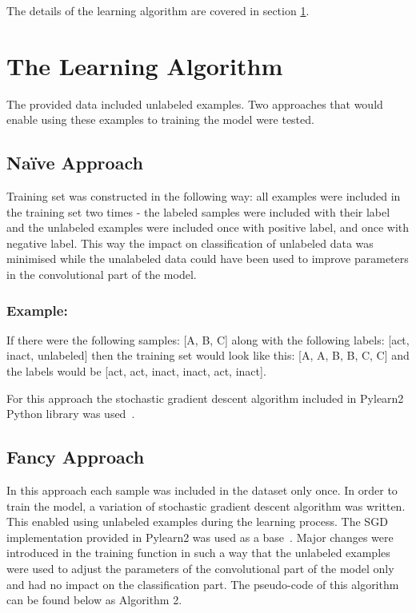 \documentclass[a4paper,10pt]{report}
\begin{document}
	
	The details of the learning algorithm are covered in section \ref{sec:learning_algorithm}.	
	
      
    \section{The Learning Algorithm}\label{sec:learning_algorithm} 
    The provided data included unlabeled examples. Two approaches that would enable using these examples to training the model were tested. 
    
      \subsection{Na\"{i}ve Approach}
      Training set was constructed in the following way: all examples were included in the training set two times - the labeled samples were included with their label and the unlabeled examples were included once with positive label, and once with negative label. This way the impact on classification of unlabeled data was minimised while the unalabeled data could have been used to improve parameters in the convolutional part of the model. 
	  
      \subsubsection{Example:}
      If there were the following samples: [A, B, C] along with the following labels: [act, inact, unlabeled] then the training set would look like this: [A, A, B, B, C, C] and the labels would be [act, act, inact, inact, act, inact]. 
      
    For this approach the stochastic gradient descent algorithm included in Pylearn2 Python library was used~\cite{Pylearn2}. 
	  
      \subsection{Fancy Approach}
      In this approach each sample was included in the dataset only once. In order to train the model, a variation of stochastic gradient descent algorithm was written. This enabled using unlabeled examples during the learning process. The SGD implementation provided in Pylearn2 was used as a base~\cite{Pylearn2}. Major changes were introduced in the training function in such a way that the unlabeled examples were used to adjust the parameters of the convolutional part of the model only and had no impact on the classification part. The pseudo-code of this algorithm can be found below as Algorithm 2. 
      
\end{document}
